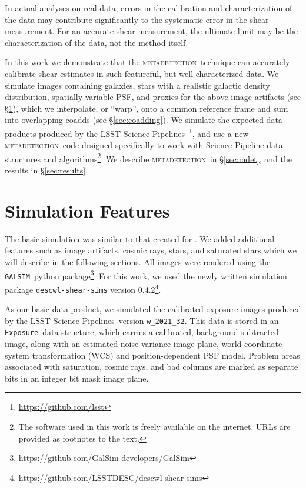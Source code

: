 \documentclass[twocolumn,twocolappendix,astrosym]{openjournal}
\newcommand{\galsim}{\texttt{GALSIM}}
\newcommand{\calexp}{\texttt{Exposure}}
\newcommand{\dm}{LSST Science Pipelines}
\newcommand{\mdet}{\textsc{metadetection}}
\begin{document}
In actual analyses on real data, errors in the calibration and characterization
of the data may contribute significantly to the systematic error in the shear
measurement.  For an accurate shear measurement, the ultimate limit may be the
characterization of the data, not the method itself.

In this work we demonstrate that the \mdet\ technique can accurately calibrate
shear estimates in such featureful, but well-characterized data.  We simulate
images containing galaxies, stars with a realistic galactic density
distribution, spatially variable PSF, and proxies for the above image artifacts
(see \S \ref{sec:sim}), which we interpolate, or ``warp'', onto a common
reference frame and sum into overlapping coadds (see \S \ref{sec:coadding}).
We simulate the expected data products produced by the \dm\
\citep{BoschLSST2019,BoschHSC2017}\footnote{\url{https://github.com/lsst}}, and
use a new \mdet\ code designed specifically to work with Science Pipeline data
structures and algorithms\footnote{The software used in this work is freely
available on the internet.  URLs are provided as footnotes to the text.}.  We
describe \mdet\ in \S \ref{sec:mdet}, and the results in \S \ref{sec:results}.

\section{Simulation Features} \label{sec:sim}

The basic simulation was similar to that created for \citep{mdet20}.  We added
additional features such as image artifacts, cosmic rays, stars, and saturated
stars which we will describe in the following sections.  All images were
rendered using the \galsim\ python
package\footnote{\url{https://github.com/GalSim-developers/GalSim}}. For this work,
we used the newly written simulation package
\texttt{descwl-shear-sims} version
0.4.2\footnote{\url{https://github.com/LSSTDESC/descwl-shear-sims}}.

As our basic data product, we simulated the calibrated exposure images produced
by the \dm\ version \texttt{w\_2021\_32}.  This data is stored in an \calexp\
data structure, which carries a calibrated, background subtracted image, along
with an estimated noise variance image plane, world coordinate system
transformation (WCS) and position-dependent PSF model.  Problem areas
associated with saturation, cosmic rays, and bad columns are marked as separate
bits in an integer bit mask image plane.
\end{document}
